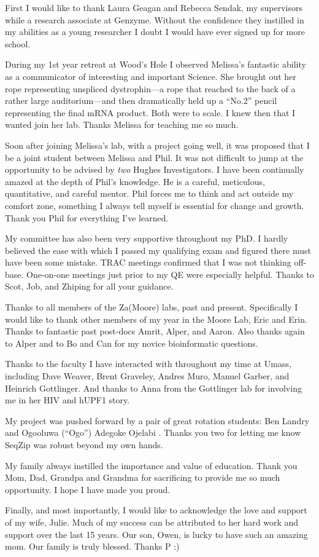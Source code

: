 \acknowledgements{}\label{hd:acknowledgements}

First I would like to thank Laura Geagan and Rebecca Sendak, my supervisors while a research associate at Genzyme. Without the confidence they instilled in my abilities as a young researcher I doubt I would have ever signed up for more school.

During my 1st year retreat at Wood’s Hole I observed Melissa's fantastic ability as a communicator of interesting and important Science. She brought out her rope representing unspliced dystrophin---a rope that reached to the back of a rather large auditorium---and then dramatically held up a ``No.2'' pencil representing the final mRNA product. Both were to scale. I knew then that I wanted join her lab. Thanks Melissa for teaching me so much.

Soon after joining Melissa’s lab, with a project going well, it was proposed that I be a joint student between Melissa and Phil. It was not difficult to jump at the opportunity to be advised by \textit{two} Hughes Investigators. I have been continually amazed at the depth of Phil’s knowledge. He is a careful, meticulous, quantitative, and careful mentor. Phil forces me to think and act outside my comfort zone, something I always tell myself is essential for change and growth. Thank you Phil for everything I've learned.

My committee has also been very supportive throughout my PhD. I hardly believed the ease with which I passed my qualifying exam and figured there must have been some mistake. TRAC meetings confirmed that I was not thinking off-base. One-on-one meetings just prior to my QE were especially helpful. Thanks to Scot, Job, and Zhiping for all your guidance.

Thanks to all members of the Za(Moore) labs, past and present. Specifically I would like to thank other members of my year in the Moore Lab, Eric and Erin. Thanks to fantastic past post-docs Amrit, Alper, and Aaron. Also thanks again to Alper and to Bo and Can for my novice bioinformatic questions.

Thanks to the faculty I have interacted with throughout my time at Umass, including Dave Weaver, Brent Graveley, Andres Muro, Manuel Garber, and Heinrich Gottlinger. And thanks to Anna from the Gottlinger lab for involving me in her HIV and hUPF1 story.

My project was pushed forward by a pair of great rotation students: Ben Landry and Ogooluwa (``Ogo'') Adegoke Ojelabi . Thanks you two for letting me know SeqZip was robust beyond my own hands.

My family always instilled the importance and value of education. Thank you Mom, Dad, Grandpa and Grandma for sacrificing to provide me so much opportunity. I hope I have made you proud.

Finally, and most importantly, I would like to acknowledge the love and support of my wife, Julie. Much of my success can be attributed to her hard work and support over the last 15 years. Our son, Owen, is lucky to have such an amazing mom. Our family is truly blessed. Thanks P :)

\clearpage %